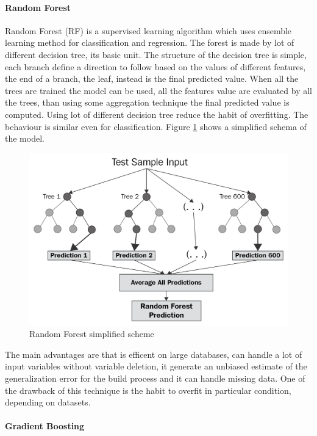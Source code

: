 \documentclass[%
    corpo=12pt,
    twoside,
    oldstyle,
    autoretitolo,
    greek,
    evenboxes,
]{toptesi}
\begin{document}
\paragraph{Random Forest}
Random Forest (RF) is a supervised learning algorithm which uses ensemble learning method for classification and regression. The forest is made by lot of different decision tree, its basic unit. The structure of the decision tree is simple, each branch define a direction to follow based on the values of different features, the end of a branch, the leaf, instead is the final predicted value. When all the trees are trained the model can be used, all the features value are evaluated by all the trees, than using some aggregation technique the final predicted value is computed. Using lot of different decision tree reduce the habit of overfitting. The behaviour is similar even for classification. Figure \ref{fig:rf} shows a simplified schema of the model.
\begin{figure}[!h]
  \includegraphics[width=\linewidth]{figure/rf.png}
  \caption{Random Forest simplified scheme \cite{rf}}
  \label{fig:rf}
\end{figure}

The main advantages are that is efficent on large databases, can handle a lot of input variables without variable deletion, it generate an unbiased estimate of the generalization error for the build process and it can handle missing data.
One of the drawback of this technique is the habit to overfit in particular condition, depending on datasets.

\paragraph{Gradient Boosting}
\end{document}
